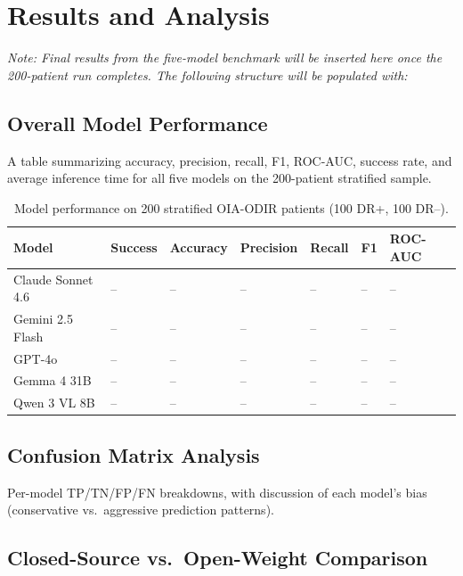 \documentclass[11pt,a4paper]{article}
\begin{document}
\section{Results and Analysis}

\textit{Note: Final results from the five-model benchmark will be inserted here once the 200-patient run completes. The following structure will be populated with:}

\subsection{Overall Model Performance}

A table summarizing accuracy, precision, recall, F1, ROC-AUC, success rate, and average inference time for all five models on the 200-patient stratified sample.

\begin{table}[H]
\centering
\caption{Model performance on 200 stratified OIA-ODIR patients (100 DR+, 100 DR--).}
\label{tab:results}
\begin{tabularx}{\textwidth}{lXXXXXX}
\toprule
\textbf{Model} & \textbf{Success} & \textbf{Accuracy} & \textbf{Precision} & \textbf{Recall} & \textbf{F1} & \textbf{ROC-AUC} \\
\midrule
Claude Sonnet 4.6 & -- & -- & -- & -- & -- & -- \\
Gemini 2.5 Flash & -- & -- & -- & -- & -- & -- \\
GPT-4o & -- & -- & -- & -- & -- & -- \\
Gemma 4 31B & -- & -- & -- & -- & -- & -- \\
Qwen 3 VL 8B & -- & -- & -- & -- & -- & -- \\
\bottomrule
\end{tabularx}
\end{table}

\subsection{Confusion Matrix Analysis}

Per-model TP/TN/FP/FN breakdowns, with discussion of each model's bias (conservative vs.\ aggressive prediction patterns).

\subsection{Closed-Source vs.\ Open-Weight Comparison}
\end{document}
